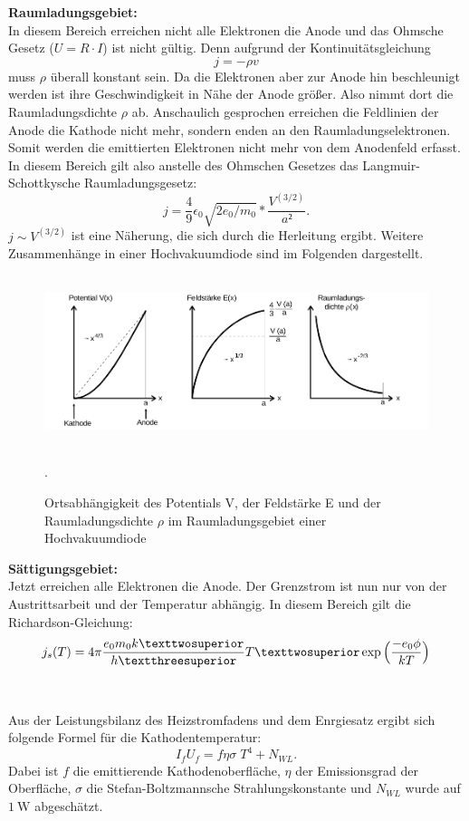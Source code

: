 \textbf{Raumladungsgebiet:}\\
In diesem Bereich erreichen nicht alle Elektronen die Anode und das Ohmsche Gesetz
($U=R\cdot I$) ist nicht gültig. Denn aufgrund der Kontinuitätsgleichung
\begin{equation}
  j=  -\rho v
\end{equation}
muss $\rho$ überall konstant sein. Da die Elektronen aber zur Anode hin beschleunigt werden
ist ihre Geschwindigkeit in Nähe der Anode größer. Also nimmt dort die Raumladungsdichte
$\rho$ ab. Anschaulich gesprochen erreichen die Feldlinien der Anode die Kathode nicht mehr,
sondern enden an den Raumladungselektronen. Somit werden die emittierten Elektronen
nicht mehr von dem Anodenfeld erfasst.
In diesem Bereich gilt also anstelle des Ohmschen Gesetzes das
Langmuir-Schottkysche Raumladungsgesetz:
\begin{equation}
  j=\frac{4}{9}\epsilon_{0}\sqrt{2e_{0}/m_{0}}*\frac{V^{(3/2)}}{a²}.
  \label{eqn:lang}
\end{equation}
$j \sim V^{(3/2)}$ ist eine Näherung, die sich durch die Herleitung ergibt.
 Weitere Zusammenhänge in einer Hochvakuumdiode sind im Folgenden dargestellt.
 \begin{figure}[H]
   \centering
   \includegraphics[height=5cm]{diagramm.png}
   \caption{Ortsabhängigkeit des Potentials V, der Feldstärke E und der Raumladungsdichte $\rho$
   im Raumladungsgebiet einer Hochvakuumdiode}
   \label{fig:diagramm}
   \cite{skript}.
 \end{figure}

\textbf{Sättigungsgebiet:}\\
Jetzt erreichen alle Elektronen die Anode. Der Grenzstrom ist nun nur von der
Austrittsarbeit und der Temperatur abhängig. In diesem Bereich gilt die
Richardson-Gleichung:
\begin{equation}
  j_{s}(T)= 4 \pi \frac{e_{0}m_{0}k²}{h³}T²\exp{\Bigl(\frac{-e_{0}\phi}{kT}\Bigr)}
  \label{eqn:satt}
\end{equation}
\\
\\


Aus der Leistungsbilanz des Heizstromfadens und dem Enrgiesatz ergibt sich folgende Formel
für die Kathodentemperatur:
\begin{equation}
  I_{f}U_{f}=f \eta \sigma\; T^{4}+N_{WL}.
  \label{eqn:temperatur}
\end{equation}
Dabei ist $f$ die emittierende Kathodenoberfläche, $\eta$ der Emissionsgrad der Oberfläche,
$\sigma$ die Stefan-Boltzmannsche Strahlungskonstante und $N_{WL}$ wurde auf $\SI{1}{\W}$
abgeschätzt.
\label{sec:Theorie}
